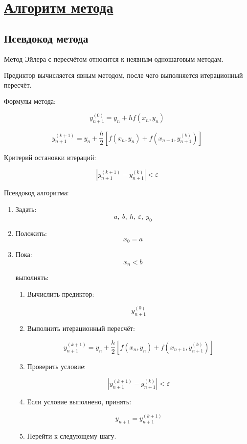 \documentclass[14pt]{extarticle}
\begin{document}
	
	\newpage
	\section{\Large \underline{Алгоритм метода}}
	
	\subsection{Псевдокод метода}
	
	Метод Эйлера с пересчётом относится к неявным
	одношаговым методам.
	
	Предиктор вычисляется явным методом,
	после чего выполняется итерационный пересчёт.
	
	Формулы метода:
	
	\[
	y_{n+1}^{(0)}
	=
	y_n+h f(x_n,y_n)
	\]
	
	\[
	y_{n+1}^{(k+1)}
	=
	y_n
	+
	\frac{h}{2}
	\left[
	f(x_n,y_n)
	+
	f(x_{n+1},y_{n+1}^{(k)})
	\right]
	\]
	
	Критерий остановки итераций:
	
	\[
	\left|
	y_{n+1}^{(k+1)}
	-
	y_{n+1}^{(k)}
	\right|
	<
	\varepsilon
	\]
	
	Псевдокод алгоритма:
	
	\begin{enumerate}
		\item Задать:
		\[
		a,\ b,\ h,\ \varepsilon,\ y_0
		\]
		
		\item Положить:
		\[
		x_0=a
		\]
		
		\item Пока:
		\[
		x_n<b
		\]
		
		выполнять:
		
		\begin{enumerate}
			\item Вычислить предиктор:
			
			\[
			y_{n+1}^{(0)}
			\]
			
			\item Выполнить итерационный пересчёт:
			
			\[
			y_{n+1}^{(k+1)}
			=
			y_n
			+
			\frac{h}{2}
			\left[
			f(x_n,y_n)
			+
			f(x_{n+1},y_{n+1}^{(k)})
			\right]
			\]
			
			\item Проверить условие:
			
			\[
			\left|
			y_{n+1}^{(k+1)}
			-
			y_{n+1}^{(k)}
			\right|
			<
			\varepsilon
			\]
			
			\item Если условие выполнено,
			принять:
			
			\[
			y_{n+1}=y_{n+1}^{(k+1)}
			\]
			
			\item Перейти к следующему шагу.
		\end{enumerate}
	\end{enumerate}
	
\end{document}

